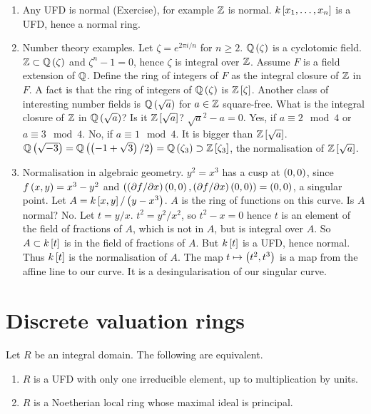 \begin{example*}
\hfill
\begin{enumerate}
\item Any UFD is normal (Exercise), for example $ \Z $ is normal. $ k\sb{x_1, \dots, x_n} $ is a UFD, hence a normal ring.
\item Number theory examples. Let $ \zeta = e^{2\pi i / n} $ for $ n \ge 2 $. $ \Q\rb{\zeta} $ is a cyclotomic field. $ \Z \subset \Q\rb{\zeta} $ and $ \zeta^n - 1 = 0 $, hence $ \zeta $ is integral over $ \Z $. Assume $ F $ is a field extension of $ \Q $. Define the ring of integers of $ F $ as the integral closure of $ \Z $ in $ F $. A fact is that the ring of integers of $ \Q\rb{\zeta} $ is $ \Z\sb{\zeta} $. Another class of interesting number fields is $ \Q\rb{\sqrt{a}} $ for $ a \in \Z $ square-free. What is the integral closure of $ \Z $ in $ \Q\rb{\sqrt{a}} $? Is it $ \Z\sb{\sqrt{a}} $? $ \sqrt{a}^2 - a = 0 $. Yes, if $ a \equiv 2 \mod 4 $ or $ a \equiv 3 \mod 4 $. No, if $ a \equiv 1 \mod 4 $. It is bigger than $ \Z\sb{\sqrt{a}} $. $ \Q\rb{\sqrt{-3}} = \Q\rb{\rb{-1 + \sqrt{3}} / 2} = \Q\rb{\zeta_3} \supset \Z\sb{\zeta_3} $, the normalisation of $ \Z\sb{\sqrt{a}} $.
\item Normalisation in algebraic geometry. $ y^2 = x^3 $ has a cusp at $ \rb{0, 0} $, since $ f\rb{x, y} = x^3 - y^2 $ and $ \rb{\rb{\partial f / \partial x}\rb{0, 0}, \rb{\partial f / \partial x}\rb{0, 0}} = \rb{0, 0} $, a singular point. Let $ A = k\sb{x, y} / \rb{y - x^3} $. $ A $ is the ring of functions on this curve. Is $ A $ normal? No. Let $ t = y / x $. $ t^2 = y^2 / x^2 $, so $ t^2 - x = 0 $ hence $ t $ is an element of the field of fractions of $ A $, which is not in $ A $, but is integral over $ A $. So $ A \subset k\sb{t} $ is in the field of fractions of $ A $. But $ k\sb{t} $ is a UFD, hence normal. Thus $ k\sb{t} $ is the normalisation of $ A $. The map $ t \mapsto \rb{t^2, t^3} $ is a map from the affine line to our curve. It is a desingularisation of our singular curve.
\end{enumerate}
\end{example*}

\pagebreak

\section{Discrete valuation rings}


\begin{theorem}
Let $ R $ be an integral domain. The following are equivalent.
\begin{enumerate}
\item $ R $ is a UFD with only one irreducible element, up to multiplication by units.
\item $ R $ is a Noetherian local ring whose maximal ideal is principal.
\end{enumerate}
\end{theorem}

